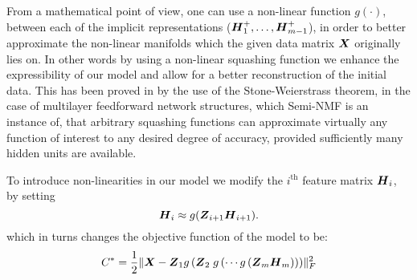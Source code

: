 \documentclass[10pt,journal,compsoc]{IEEEtran}
\providecommand{\norm}[1]{\lVert#1\rVert}
\begin{document}
From a mathematical point of view, one can use a non-linear function $g(\cdot)$, between each of the implicit representations ($\boldsymbol H_1^+, \ldots, \boldsymbol H_{m-1}^+$), in order to better approximate the non-linear manifolds which the given data matrix $\boldsymbol X$ originally lies on. In other words by using a non-linear squashing function we enhance the expressibility of our model and allow for a better reconstruction of the initial data. This has been proved in \cite{hornik1989multilayer} by the use of the Stone-Weierstrass theorem, in the case of multilayer feedforward network structures, which Semi-NMF is an instance of, that arbitrary squashing functions can approximate virtually any function of interest to any desired degree of accuracy, provided sufficiently many hidden units are available. 

To introduce non-linearities in our model we modify the $i^{\text{th}}$ feature matrix ${\boldsymbol{H}}_i$, by setting
\begin{equation}{\boldsymbol{H}}_{i} \approx g(\boldsymbol Z_{i+1} \boldsymbol H_{i+1}).
\end{equation}
which in turns changes the objective function of the model  to be:
\begin{equation}
C^* = \frac{1}{2} \norm{\boldX - \boldZ_1 g\left( \boldZ_2\; g\left( \cdots g\left( \boldZ_m \boldH_m \right)\right)\right)}^2_F
\end{equation}
\end{document}
